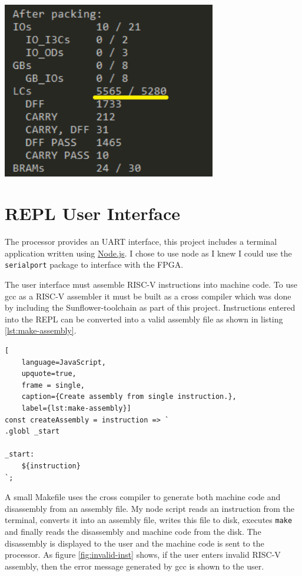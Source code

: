 \documentclass[10pt]{article}
\newenvironment{Figure}
  {\par\medskip\noindent\minipage{\linewidth}}
  {\endminipage\par\medskip}
\begin{document}
\begin{multicols}{2}
\begin{Figure}
  \centering
  \includegraphics[width=0.7\textwidth]{../images/fpga-resources.png}
  \label{fig:lcs}
\end{Figure}

\section{REPL User Interface}

The processor provides an UART interface, this project includes a terminal application written using \href{https://nodejs.org}{Node.js}.
I chose to use node as I knew I could use the \verb|serialport| package to interface with the FPGA.

The user interface must assemble RISC-V instructions into machine code.
To use gcc as a RISC-V assembler it must be built as a cross compiler which was done by including the Sunflower-toolchain as part of this project\cite{sunflower}.
Instructions entered into the REPL can be converted into a valid assembly file as shown in listing \ref{lst:make-assembly}.

\begin{lstlisting}[
    language=JavaScript,
    upquote=true,
    frame = single,
    caption={Create assembly from single instruction.},
    label={lst:make-assembly}]
const createAssembly = instruction => `
.globl _start

_start:
	${instruction}
`;
\end{lstlisting}

A small Makefile uses the cross compiler to generate both machine code and disassembly from an assembly file.
My node script reads an instruction from the terminal, converts it into an assembly file, writes this file to disk, executes \verb|make| and finally reads the disassembly and machine code from the disk.
The disassembly is displayed to the user and the machine code is sent to the processor.
As figure \ref{fig:invalid-inst} shows, if the user enters invalid RISC-V assembly, then the error message generated by gcc is shown to the user.


\end{multicols}
\end{document}
